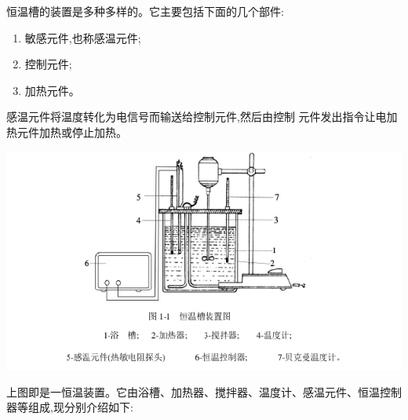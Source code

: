 \documentclass[11pt]{report}
\begin{document}
恒温槽的装置是多种多样的。它主要包括下面的几个部件:
\begin{enumerate}
\item 敏感元件,也称感温元件;
\item 控制元件;
\item 加热元件。
\end{enumerate}

  感温元件将温度转化为电信号而输送给控制元件,然后由控制
元件发出指令让电加热元件加热或停止加热。

\begin{center}
\includegraphics[width=.9\linewidth]{../img/1.png}
\end{center}

上图即是一恒温装置。它由浴槽、加热器、搅拌器、温度计、感温元件、恒温控制
器等组成,现分别介绍如下:
\end{document}
